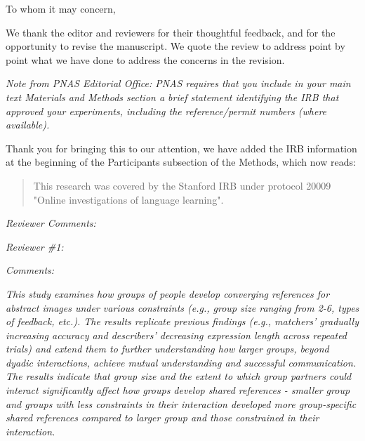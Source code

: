 \documentclass{stanfordletter}
\newcommand{\theysaid}[1]{\begin{leftbar} \noindent 
		\textsl{ #1}\end{leftbar}}
\newcommand{\revised}[1]{\begin{quote}	#1 \end{quote}}
\begin{document}
	\signature{Veronica Boyce \\ Robert D. Hawkins \\ Noah D. Goodman \\ Michael C. Frank}
	
	
	\begin{letter}{}
		
		
          \opening{To whom it may concern, } 

          
           
          
         
          We thank the editor and reviewers for their thoughtful feedback, and for the opportunity to revise the manuscript. We quote the review to address point by point what we have done to address the concerns in the revision.  
          
          \theysaid{Note from PNAS Editorial Office: PNAS requires that you include in your main text Materials and Methods section a brief statement identifying the IRB that approved your experiments, including the reference/permit numbers (where available).}
          Thank you for bringing this to our attention, we have added the IRB information at the beginning of the Participants subsection of the Methods, which now reads: 
\revised{This research was covered by the Stanford IRB under protocol 20009 "Online investigations of language learning". } 
          
          
          \theysaid{Reviewer Comments:}
         \theysaid{Reviewer \#1:}
          
          \theysaid{Comments:}
          \theysaid{This study examines how groups of people develop converging references for abstract images under various constraints (e.g., group size ranging from 2-6, types of feedback, etc.). The results replicate previous findings (e.g., matchers' gradually increasing accuracy and describers' decreasing expression length across repeated trials) and extend them to further understanding how larger groups, beyond dyadic interactions, achieve mutual understanding and successful communication. The results indicate that group size and the extent to which group partners could interact significantly affect how groups develop shared references - smaller group and groups with less constraints in their interaction developed more group-specific shared references compared to larger group and those constrained in their interaction.}
          

\end{letter}
\end{document}
